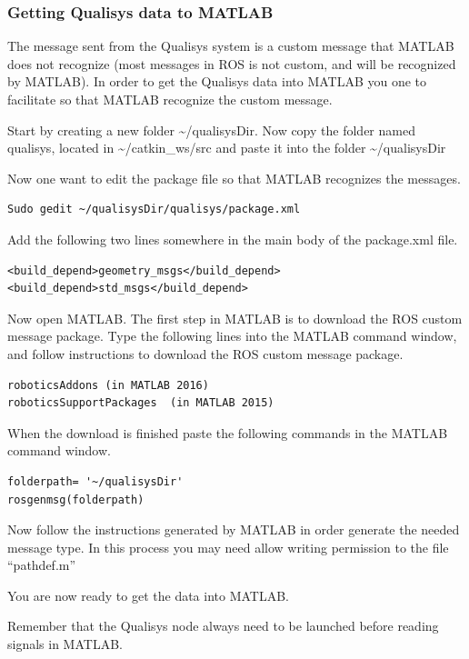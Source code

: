 \documentclass[a4paper,twoside,english]{report}
\begin{document}
\subsubsection{Getting Qualisys data to MATLAB}

The message sent from the Qualisys system is a custom message that
MATLAB does not recognize (most messages in ROS is not custom, and
will be recognized by MATLAB). In order to get the Qualisys data into
MATLAB you one to facilitate so that MATLAB recognize the custom message.

Start by creating a new folder \textasciitilde{}/qualisysDir. Now
copy the folder named qualisys, located in \textasciitilde{}/catkin\_ws/src
and paste it into the folder \textasciitilde{}/qualisysDir

Now one want to edit the package file so that MATLAB recognizes the
messages.

\begin{verbatim}Sudo gedit ~/qualisysDir/qualisys/package.xml\end{verbatim}

Add the following two lines somewhere in the main body of the package.xml
file.

\begin{verbatim}<build_depend>geometry_msgs</build_depend>
<build_depend>std_msgs</build_depend>\end{verbatim}

Now open MATLAB. The first step in MATLAB is to download the ROS custom
message package. Type the following lines into the MATLAB command
window, and follow instructions to download the ROS custom message
package.

\begin{verbatim}roboticsAddons (in MATLAB 2016)
roboticsSupportPackages  (in MATLAB 2015)\end{verbatim}

When the download is finished paste the following commands in the
MATLAB command window.

\begin{verbatim}folderpath= '~/qualisysDir'
rosgenmsg(folderpath)\end{verbatim}

Now follow the instructions generated by MATLAB in order generate
the needed message type. In this process you may need allow writing
permission to the file ``pathdef.m''

You are now ready to get the data into MATLAB.

Remember that the Qualisys node always need to be launched before
reading signals in MATLAB.
\end{document}
